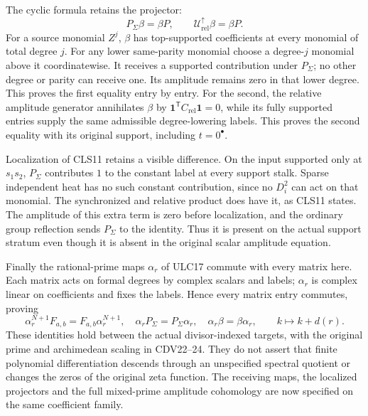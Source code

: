 \documentclass[11pt,a4paper]{article}
\theoremstyle{definition}\newtheorem{definition}[theorem]{Definition}
\begin{document}
The cyclic formula retains the projector:
\begin{equation}\tag{CLS12}
 P_\Sigma\beta=\beta P,
 \qquad\mathcal U_{\mathrm{rel}}^\uparrow\beta=\beta P.
\end{equation}
For a source monomial $Z^j$, $\beta$ has top-supported coefficients
at every monomial of total degree $j$. For any lower same-parity
monomial choose a degree-$j$ monomial above it coordinatewise.
It receives a supported contribution under $P_\Sigma$; no other
degree or parity can receive one. Its amplitude remains zero in
that lower degree. This proves the first equality entry by entry.
For the second, the relative amplitude generator annihilates
$\beta$ by $\mathbf1^{\mathsf T}C_{\mathrm{rel}}\mathbf1=0$,
while its fully supported entries supply the same admissible
degree-lowering labels. This proves the second equality with its
original support, including $t=0^\bullet$.

Localization of CLS11 retains a visible difference. On the input
supported only at $s_1s_2$, $P_\Sigma$ contributes $1$ to the
constant label at every support stalk. Sparse independent heat
has no such constant contribution, since no $D_i^2$ can act on
that monomial. The synchronized and relative product does have it,
as CLS11 states. The amplitude of this extra term is zero before
localization, and the ordinary group reflection sends $P_\Sigma$
to the identity. Thus it is present on the actual support stratum
even though it is absent in the original scalar amplitude equation.

Finally the rational-prime maps $\alpha_r$ of ULC17 commute with
every matrix here. Each matrix acts on formal degrees by complex
scalars and labels; $\alpha_r$ is complex linear on coefficients
and fixes the labels. Hence every matrix entry commutes, proving
\begin{equation}\tag{CLS13}
 \alpha_r^{N+1}F_{a,b}=F_{a,b}\alpha_r^{N+1},\quad
 \alpha_rP_\Sigma=P_\Sigma\alpha_r,\quad
 \alpha_r\beta=\beta\alpha_r,
 \qquad k\longmapsto k+d(r).
\end{equation}
These identities hold between the actual divisor-indexed targets,
with the original prime and archimedean scaling in CDV22--24.
They do not assert that finite polynomial differentiation descends
through an unspecified spectral quotient or changes the zeros of
the original zeta function. The receiving maps, the localized
projectors and the full mixed-prime amplitude cohomology are now
specified on the same coefficient family.

\clearpage
\end{document}
